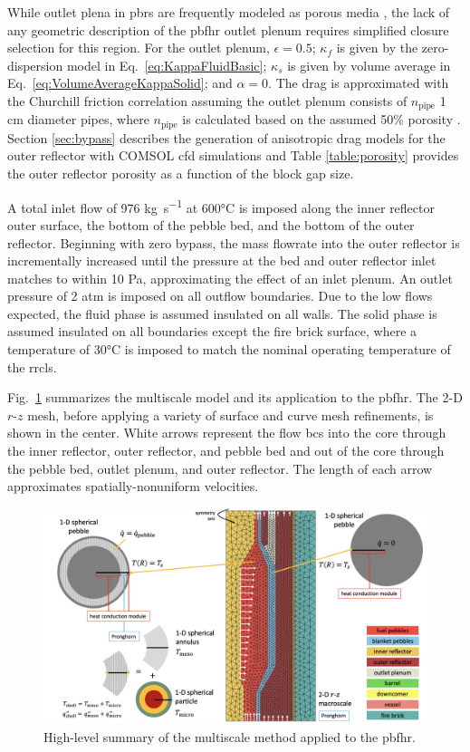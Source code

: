 While outlet plena in \glspl{pbr} are frequently modeled as porous media \cite{ximing}, the lack of any geometric description of the \gls{pbfhr} outlet plenum requires simplified closure selection for this region. For the outlet plenum, \(\epsilon=0.5\); \(\kappa_f\) is given by the zero-dispersion model in Eq.\ \eqref{eq:KappaFluidBasic}; \(\kappa_s\) is given by volume average in Eq.\ \eqref{eq:VolumeAverageKappaSolid}; and \(\alpha=0\). The drag is approximated with the Churchill friction correlation assuming the outlet plenum consists of \(n_\text{pipe}\) 1 \si{\centi\meter} diameter pipes, where \(n_\text{pipe}\) is calculated based on the assumed 50\% porosity \cite{churchill}. Section \ref{sec:bypass} describes the generation of anisotropic drag models for the outer reflector with COMSOL \gls{cfd} simulations and Table \ref{table:porosity} provides the outer reflector porosity as a function of the block gap size. 

A total inlet flow of 976 \si{\kilo\gram\per\second} at 600\si{\celsius} is imposed along the inner reflector outer surface, the bottom of the pebble bed, and the bottom of the outer reflector. Beginning with zero bypass, the mass flowrate into the outer reflector is incrementally increased until the pressure at the bed and outer reflector inlet matches to within 10 \si{\pascal}, approximating the effect of an inlet plenum. An outlet pressure of 2 atm is imposed on all outflow boundaries. Due to the low flows expected, the fluid phase is assumed insulated on all walls. The solid phase is assumed insulated on all boundaries except the fire brick surface, where a temperature of 30\si{\celsius} is imposed to match the nominal operating temperature of the \gls{rrcls}. 

Fig.\ \ref{fig:high_level} summarizes the multiscale model and its application to the \gls{pbfhr}. The 2-D $r$-$z$ mesh, before applying a variety of surface and curve mesh refinements, is shown in the center. White arrows represent the flow \glspl{bc} into the core through the inner reflector, outer reflector, and pebble bed and out of the core through the pebble bed, outlet plenum, and outer reflector. The length of each arrow approximates spatially-nonuniform velocities.

\begin{figure}[h!]
\centering
\includegraphics[width=\linewidth]{figs/high_level_pbfhr.png}
\caption{High-level summary of the multiscale method applied to the \gls{pbfhr}.}
\label{fig:high_level}
\end{figure}

